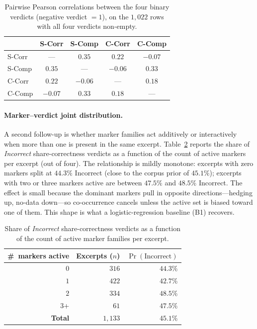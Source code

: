 \documentclass[11pt,a4paper]{article}
\begin{document}
\begin{table}[t]
\centering\small
\caption{Pairwise Pearson correlations between the four binary
verdicts (negative verdict $=1$), on the $1{,}022$ rows with all four
verdicts non-empty.}
\label{tab:crossaxis}
\begin{tabular}{lcccc}
\toprule
       & S-Corr & S-Comp & C-Corr & C-Comp \\
\midrule
S-Corr & ---    & $0.35$ & $0.22$ & $-0.07$ \\
S-Comp & $0.35$ & ---    & $-0.06$ & $0.33$ \\
C-Corr & $0.22$ & $-0.06$& ---    & $0.18$ \\
C-Comp & $-0.07$& $0.33$ & $0.18$ & ---    \\
\bottomrule
\end{tabular}
\end{table}

\paragraph{Marker--verdict joint distribution.}
A second follow-up is whether marker families act additively or
interactively when more than one is present in the same excerpt.
Table~\ref{tab:joint} reports the share of \emph{Incorrect}
share-correctness verdicts as a function of the count of active
markers per excerpt (out of four). The relationship is mildly
monotone: excerpts with zero markers split at $44.3\%$ Incorrect
(close to the corpus prior of $45.1\%$); excerpts with two or three
markers active are between $47.5\%$ and $48.5\%$ Incorrect. The
effect is small because the dominant markers pull in opposite
directions---hedging up, no-data down---so co-occurrence cancels
unless the active set is biased toward one of them. This shape is
what a logistic-regression baseline (B1) recovers.

\begin{table}[t]
\centering\small
\caption{Share of \emph{Incorrect} share-correctness verdicts as a
function of the count of active marker families per excerpt.}
\label{tab:joint}
\begin{tabular}{rrr}
\toprule
\#~markers active & Excerpts ($n$) & $\Pr(\text{Incorrect})$ \\
\midrule
$0$  & $\phantom{1,}316$ & $44.3\%$ \\
$1$  & $\phantom{1,}422$ & $42.7\%$ \\
$2$  & $\phantom{1,}334$ & $48.5\%$ \\
$3$+ & $\phantom{1,1,}61$ & $47.5\%$ \\
\midrule
\textbf{Total}     & $1{,}133$         & $45.1\%$ \\
\bottomrule
\end{tabular}
\end{table}
\end{document}
